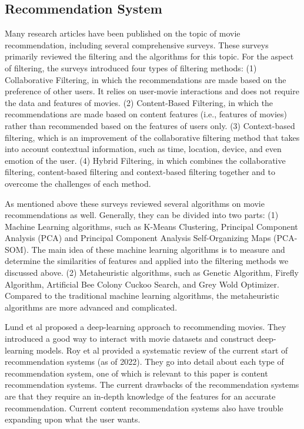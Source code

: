 \documentclass[journal]{IEEEtran}
\begin{document}
\subsection{Recommendation System}
Many research articles have been published on the topic of movie recommendation, including several comprehensive surveys\cite{RN19}. These surveys primarily reviewed the filtering and the algorithms for this topic. For the aspect of filtering, the surveys introduced four types of filtering methods: (1) Collaborative Filtering, in which the recommendations are made based on the preference of other users. It relies on user-movie interactions and does not require the data and features of movies. (2) Content-Based Filtering, in which the recommendations are made based on content features (i.e., features of movies) rather than recommended based on the features of users only. (3) Context-based filtering, which is an improvement of the collaborative filtering method that takes into account contextual information, such as time, location, device, and even emotion of the user. (4) Hybrid Filtering, in which combines the collaborative filtering, content-based filtering and context-based filtering together and to overcome the challenges of each method.

As mentioned above these surveys reviewed several algorithms on movie recommendations as well. Generally, they can be divided into two parts: (1) Machine Learning algorithms, such as K-Means Clustering, Principal Component Analysis (PCA) and Principal Component Analysis Self-Organizing Maps (PCA-SOM). The main idea of these machine learning algorithms is to measure and determine the similarities of features and applied into the filtering methods we discussed above. (2) Metaheuristic algorithms, such as Genetic Algorithm, Firefly Algorithm, Artificial Bee Colony Cuckoo Search, and Grey Wold Optimizer. Compared to the traditional machine learning algorithms, the metaheuristic algorithms are more advanced and complicated.

Lund et al\cite{RN7} proposed a deep-learning approach to recommending movies. They introduced a good way to interact with movie datasets and construct deep-learning models.
Roy et al\cite{RN17} provided a systematic review of the current start of recommendation systems (as of 2022). They go into detail about each type of recommendation system, one of which is relevant to this paper is content recommendation systems. The current drawbacks of the recommendation systems are that they require an in-depth knowledge of the features for an accurate recommendation. Current content recommendation systems also have trouble expanding upon what the user wants.
\end{document}
